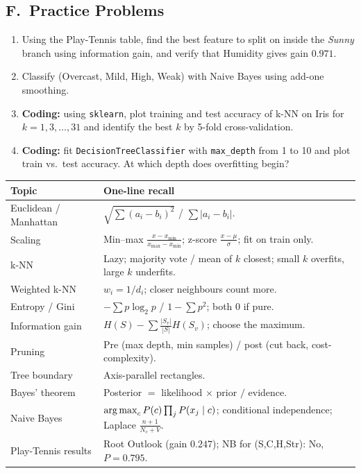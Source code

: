 \subsection*{F.\ Practice Problems}
\begin{enumerate}
  \item Using the Play-Tennis table, find the best feature to split on inside the \emph{Sunny} branch using information gain, and verify that Humidity gives gain $0.971$.
  \item Classify (Overcast, Mild, High, Weak) with Naive Bayes using add-one smoothing.
  \item \textbf{Coding:} using \texttt{sklearn}, plot training and test accuracy of k-NN on Iris for $k=1,3,\dots,31$ and identify the best $k$ by 5-fold cross-validation.
  \item \textbf{Coding:} fit \texttt{DecisionTreeClassifier} with \texttt{max\_depth} from 1 to 10 and plot train vs.\ test accuracy. At which depth does overfitting begin?
\end{enumerate}

\begin{revision}
\begin{center}\small
\begin{tabular}{@{}p{3.6cm}p{9.6cm}@{}}
\toprule
\textbf{Topic} & \textbf{One-line recall}\\
\midrule
Euclidean / Manhattan & $\sqrt{\sum(a_i-b_i)^2}$ / $\sum|a_i-b_i|$.\\
Scaling & Min--max $\frac{x-x_{\min}}{x_{\max}-x_{\min}}$; z-score $\frac{x-\mu}{\sigma}$; fit on train only.\\
k-NN & Lazy; majority vote / mean of $k$ closest; small $k$ overfits, large $k$ underfits.\\
Weighted k-NN & $w_i=1/d_i$; closer neighbours count more.\\
Entropy / Gini & $-\sum p\log_2p$ / $1-\sum p^2$; both $0$ if pure.\\
Information gain & $H(S)-\sum\frac{|S_v|}{|S|}H(S_v)$; choose the maximum.\\
Pruning & Pre (max depth, min samples) / post (cut back, cost-complexity).\\
Tree boundary & Axis-parallel rectangles.\\
Bayes' theorem & Posterior $=$ likelihood $\times$ prior $/$ evidence.\\
Naive Bayes & $\operatorname*{arg\,max}_cP(c)\prod_jP(x_j\mid c)$; conditional independence; Laplace $\frac{n+1}{N_c+V}$.\\
Play-Tennis results & Root Outlook (gain $0.247$); NB for (S,C,H,Str): No, $P=0.795$.\\
\bottomrule
\end{tabular}
\end{center}
\end{revision}
